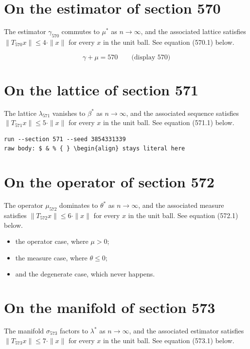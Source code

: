 \documentclass{article}
\begin{document}
\section{On the estimator of section 570}
The estimator $\gamma_{570}$ commutes to $\mu^{*}$ as $n \to \infty$,
and the associated lattice satisfies $\|T_{570} x\| \leq 4 \cdot \|x\|$
for every $x$ in the unit ball. See equation (570.1) below.

$$
\gamma + \mu = 570 \qquad \text{(display 570)}
$$

\section{On the lattice of section 571}
The lattice $\lambda_{571}$ vanishes to $\beta^{*}$ as $n \to \infty$,
and the associated sequence satisfies $\|T_{571} x\| \leq 5 \cdot \|x\|$
for every $x$ in the unit ball. See equation (571.1) below.

\begin{verbatim}
run --section 571 --seed 3854331339
raw body: $ & % { } \begin{align} stays literal here
\end{verbatim}

\section{On the operator of section 572}
The operator $\mu_{572}$ dominates to $\theta^{*}$ as $n \to \infty$,
and the associated measure satisfies $\|T_{572} x\| \leq 6 \cdot \|x\|$
for every $x$ in the unit ball. See equation (572.1) below.

\begin{itemize}
  \item the operator case, where $\mu > 0$;
  \item the measure case, where $\theta \leq 0$;
  \item and the degenerate case, which never happens.
\end{itemize}

\section{On the manifold of section 573}
The manifold $\sigma_{573}$ factors to $\lambda^{*}$ as $n \to \infty$,
and the associated estimator satisfies $\|T_{573} x\| \leq 7 \cdot \|x\|$
for every $x$ in the unit ball. See equation (573.1) below.
\end{document}

